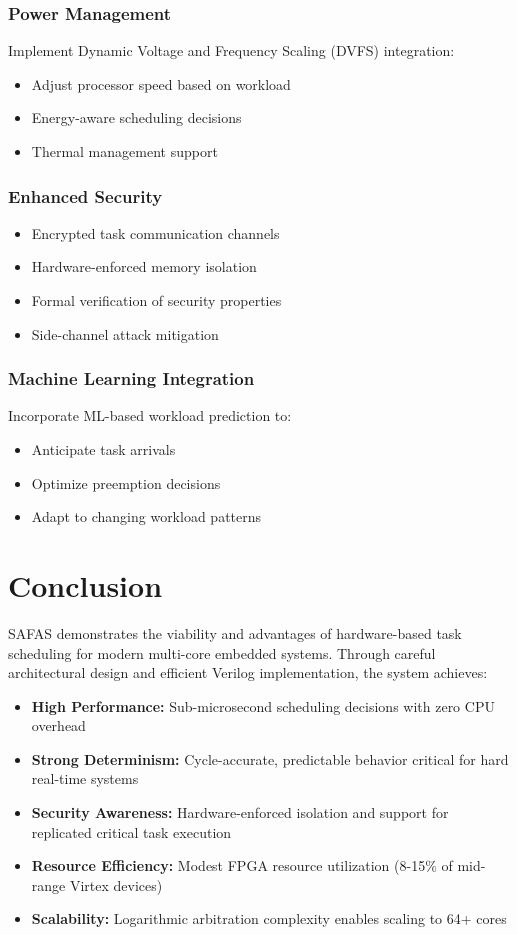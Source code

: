 \documentclass[12pt,a4paper]{article}
\begin{document}
\subsubsection{Power Management}
Implement Dynamic Voltage and Frequency Scaling (DVFS) integration:
\begin{itemize}
    \item Adjust processor speed based on workload
    \item Energy-aware scheduling decisions
    \item Thermal management support
\end{itemize}

\subsubsection{Enhanced Security}
\begin{itemize}
    \item Encrypted task communication channels
    \item Hardware-enforced memory isolation
    \item Formal verification of security properties
    \item Side-channel attack mitigation
\end{itemize}

\subsubsection{Machine Learning Integration}
Incorporate ML-based workload prediction to:
\begin{itemize}
    \item Anticipate task arrivals
    \item Optimize preemption decisions
    \item Adapt to changing workload patterns
\end{itemize}

\section{Conclusion}

SAFAS demonstrates the viability and advantages of hardware-based task scheduling for modern multi-core embedded systems. Through careful architectural design and efficient Verilog implementation, the system achieves:

\begin{itemize}
    \item \textbf{High Performance:} Sub-microsecond scheduling decisions with zero CPU overhead
    \item \textbf{Strong Determinism:} Cycle-accurate, predictable behavior critical for hard real-time systems
    \item \textbf{Security Awareness:} Hardware-enforced isolation and support for replicated critical task execution
    \item \textbf{Resource Efficiency:} Modest FPGA resource utilization (8-15\% of mid-range Virtex devices)
    \item \textbf{Scalability:} Logarithmic arbitration complexity enables scaling to 64+ cores
\end{itemize}
\end{document}
